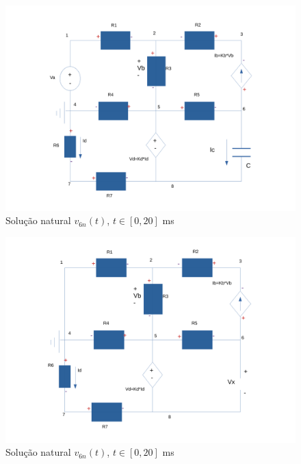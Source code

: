 \begin{figure}[h] \centering
\includegraphics[width=0.7\linewidth]{Circuito1.pdf}
\caption{Solução natural $v_{6n}(t)$, $t\in[0,20]$ ms}
\label{fig:snat}
\end{figure}

\begin{figure}[h] \centering
\includegraphics[width=0.7\linewidth]{Circuito2.pdf}
\caption{Solução natural $v_{6n}(t)$, $t\in[0,20]$ ms}
\label{fig:snat}
\end{figure}

\clearpage
